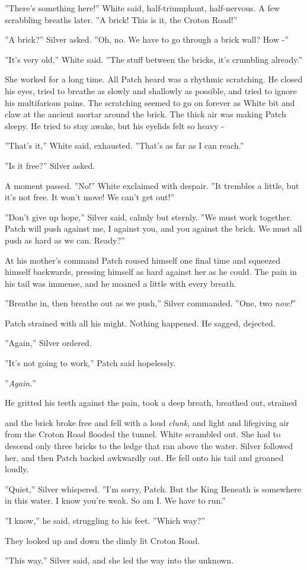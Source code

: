 \documentclass[12pt]{book}
\begin{document}
 ''There's something here!'' White said, half-triumphant, half-nervous. A few scrabbling breaths later. ''A brick! This is it, the Croton Road!''\par
 ''A brick?'' Silver asked. ''Oh, no. We have to go through a brick wall? How -''\par
 ''It's very old,'' White said. ''The stuff between the bricks, it's crumbling already.''\par
 She worked for a long time. All Patch heard was a rhythmic scratching. He closed his eyes, tried to breathe as slowly and shallowly as possible, and tried to ignore his multifarious pains. The scratching seemed to go on forever as White bit and claw at the ancient mortar around the brick. The thick air was making Patch sleepy. He tried to stay awake, but his eyelids felt so heavy -\par
 ''That's it,'' White said, exhausted. ''That's as far as I can reach.''\par
 ''Is it free?'' Silver asked.\par
 A moment passed. ''No!'' White exclaimed with despair. ''It trembles a little, but it's not free. It won't move! We can't get out!''\par
 ''Don't give up hope,'' Silver said, calmly but sternly. ''We must work together. Patch will push against me, I against you, and you against the brick. We must all push as hard as we can. Ready?''\par
 At his mother's command Patch roused himself one final time and squeezed himself backwards, pressing himself as hard against her as he could. The pain in his tail was immense, and he moaned a little with every breath.\par
 ''Breathe in, then breathe out as we push,'' Silver commanded. ''One, two %
 {\it now!}''\par
 Patch strained with all his might. Nothing happened. He sagged, dejected.\par
 ''Again,'' Silver ordered.\par
 ''It's not going to work,'' Patch said hopelessly.\par
 ''{\it Again.}''\par
 He gritted his teeth against the pain, took a deep breath, breathed out, strained %
\par
 and the brick broke free and fell with a loud {\it clunk}, and light and lifegiving air from the Croton Road flooded the tunnel. White scrambled out. She had to descend only three bricks to the ledge that ran above the water. Silver followed her, and then Patch backed awkwardly out. He fell onto his tail and groaned loudly.\par
 ''Quiet,'' Silver whispered. ''I'm sorry, Patch. But the King Beneath is somewhere in this water. I know you're weak. So am I. We have to run.''\par
 ''I know,'' he said, struggling to his feet. ''Which way?''\par
 They looked up and down the dimly lit Croton Road.\par
 ''This way,'' Silver said, and she led the way into the unknown.\par
\end{document}
